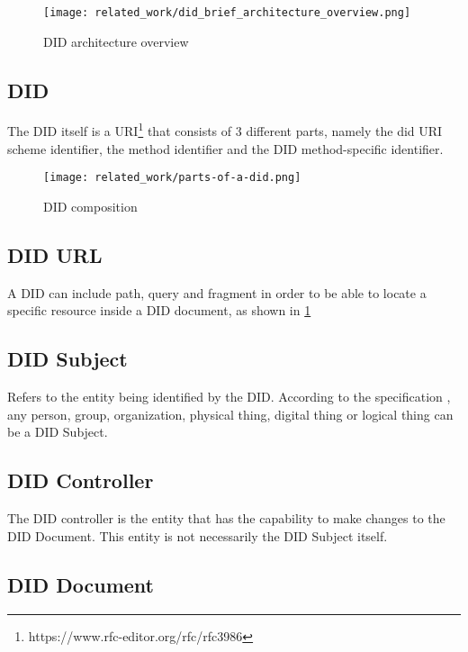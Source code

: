 \begin{figure}[H]
  \centering
  \texttt{[image: related\_work/did\_brief\_architecture\_overview.png]}
  \caption{DID architecture overview \cite{sporny_longley_sabadello_reed_steele_2021}}
  \label{fig:did_architecture}
\end{figure}

\subsection{DID}  
The DID itself is a URI\footnote{https://www.rfc-editor.org/rfc/rfc3986} that consists of 3 different parts, namely the did URI scheme identifier, the method identifier and the DID method-specific identifier.

\begin{figure}[h]
  \centering
  \texttt{[image: related\_work/parts-of-a-did.png]}
  \caption{DID composition \cite{sporny_longley_sabadello_reed_steele_2021}}
  \label{fig:did}
\end{figure}

\subsection{DID URL}

A DID can include path, query and fragment in order to be able to locate a specific resource inside a DID document, as shown in \ref{fig:did_architecture}


\subsection{DID Subject}

Refers to the entity being identified by the DID. According to the specification \cite{sporny_longley_sabadello_reed_steele_2021}, any person, group, organization, physical thing, digital thing or logical thing can be a DID Subject.

\subsection{DID Controller}

The DID controller is the entity that has the capability to make changes to the DID Document. This entity is not necessarily the DID Subject itself.
  
\subsection{DID Document}

